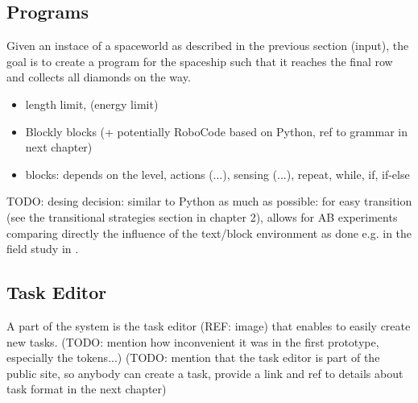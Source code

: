 
\subsection{Programs}
\label{sec:robomission.programs}

Given an instace of a spaceworld as described in the previous section (input),
the goal is to create a program for the spaceship such that
it reaches the final row and collects all diamonds on the way.

\begin{itemize}
\item length limit, (energy limit)
\item Blockly blocks (+ potentially RoboCode based on Python, ref to grammar in next chapter)
\item blocks: depends on the level, actions (...), sensing (...), repeat, while, if, if-else
\end{itemize}

TODO: desing decision: similar to Python as much as possible: for easy transition
(see the transitional strategies section in chapter 2), allows for AB experiments
comparing directly the influence of the text/block environment as done e.g.
in the field study in \cite{comparing-blocks-text-weintrop2017}.





\subsection{Task Editor}
\label{sec:robomission.task-editor}

A part of the system is the task editor (REF: image)
that enables to easily create new tasks.
(TODO: mention how inconvenient it was in the first prototype, especially the tokens...)
(TODO: mention that the task editor is part of the public site, so anybody can create a task, provide a link and ref to details about task format in the next chapter)





